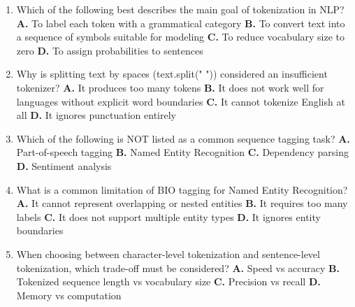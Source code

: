 \documentclass[11pt]{article}
\begin{document}
\begin{enumerate}[leftmargin=*]
  \item Which of the following best describes the main goal of tokenization in NLP?
    \textbf{A.} To label each token with a grammatical category
    \textbf{B.} To convert text into a sequence of symbols suitable for modeling
    \textbf{C.} To reduce vocabulary size to zero
    \textbf{D.} To assign probabilities to sentences

  \item Why is splitting text by spaces (text.split(" ")) considered an insufficient tokenizer?
    \textbf{A.} It produces too many tokens
    \textbf{B.} It does not work well for languages without explicit word boundaries
    \textbf{C.} It cannot tokenize English at all
    \textbf{D.} It ignores punctuation entirely

  \item Which of the following is NOT listed as a common sequence tagging task?
    \textbf{A.} Part-of-speech tagging
    \textbf{B.} Named Entity Recognition
    \textbf{C.} Dependency parsing
    \textbf{D.} Sentiment analysis

  \item What is a common limitation of BIO tagging for Named Entity Recognition?
    \textbf{A.} It cannot represent overlapping or nested entities
    \textbf{B.} It requires too many labels
    \textbf{C.} It does not support multiple entity types
    \textbf{D.} It ignores entity boundaries

  \item When choosing between character-level tokenization and sentence-level tokenization, which trade-off must be considered?
    \textbf{A.} Speed vs accuracy
    \textbf{B.} Tokenized sequence length vs vocabulary size
    \textbf{C.} Precision vs recall
    \textbf{D.} Memory vs computation

\end{enumerate}
\end{document}
